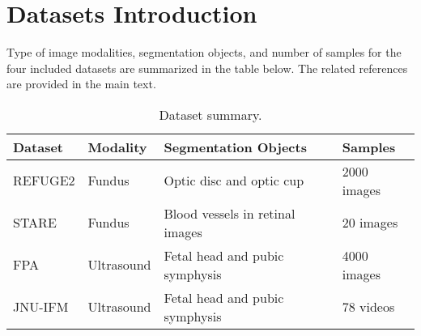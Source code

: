 \section{Datasets Introduction}
Type of image modalities, segmentation objects, and number of samples for the four included datasets are summarized in the table below. The related references are provided in the main text.
\begin{table}[h] %
  \caption{Dataset summary.}
  \centering
  \begin{tabular}{@{}p{1.3cm}p{1.3cm}p{2.4cm}l@{}} %
    \toprule
    Dataset & Modality & Segmentation Objects & Samples \\
    \midrule
    \raggedright REFUGE2 & \raggedright Fundus & \raggedright Optic disc and optic cup & 2000 images \\
    \raggedright STARE & \raggedright Fundus & \raggedright Blood vessels in retinal images & 20 images \\
    \raggedright FPA & \raggedright Ultrasound & \raggedright Fetal head and pubic symphysis & 4000 images \\
    \raggedright JNU-IFM & \raggedright Ultrasound & \raggedright Fetal head and pubic symphysis & 78 videos \\
    \bottomrule
  \end{tabular}
  \label{tab:dataset}
  \vspace{-7pt}
\end{table}